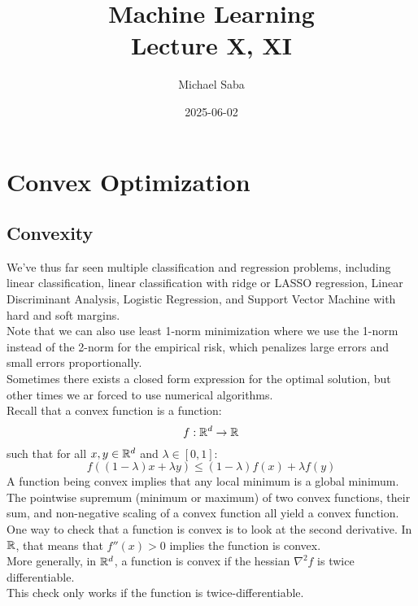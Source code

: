 \documentclass[12pt]{article}
\title{%
    \Huge Machine Learning \\
    \Large Lecture X, XI
}
\date{2025-06-02}
\author{Michael Saba}
\begin{document}
\maketitle
\newpage
\setlength{\parindent}{0pt}

\section*{Convex Optimization}
\subsection*{Convexity}

We've thus far seen multiple classification and regression
problems, including linear classification,
linear classification with ridge or LASSO regression,
Linear Discriminant Analysis, Logistic Regression,
and Support Vector Machine with hard and soft margins. \\

Note that we can also use least 1-norm minimization
where we use the 1-norm instead of the 2-norm 
for the empirical risk, which penalizes large
errors and small errors proportionally. \\

Sometimes there exists a closed form expression for 
the optimal solution, but other times we ar forced to use
numerical algorithms. \\

Recall that a convex function is a function:
\[ f: \mathbb{R}^d \to \mathbb{R} \]
such that for all $x, y \in \mathbb{R}^d$ and $\lambda \in [0, 1]$:
\[ f((1-\lambda)x + \lambda y) 
\leq (1-\lambda)f(x) + \lambda f(y)  \]
A function being convex implies that any local minimum
is a global minimum. \\

The pointwise supremum (minimum or maximum) of two 
convex functions, their sum, and non-negative
scaling of a convex function all yield a convex function. \\

One way to check that a function is convex
is to look at the second derivative.
In $\mathbb{R}$, that means that
$f''(x) > 0$ implies the function is convex. \\
More generally, in $\mathbb{R}^d$, 
a function is convex if the hessian $\nabla^2 f$
is twice differentiable. \\
This check only works if the function 
is twice-differentiable. \\
\end{document}
